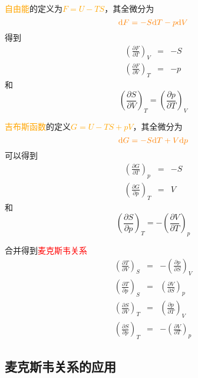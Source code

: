 \documentclass[11pt,a4paper]{article}
\newcommand{\dif}{\mathrm{d}}
\begin{document}
\textcolor{orange}{自由能}的定义为\textcolor{orange}{$F = U -TS$}，其全微分为
\begin{equation}
\color{orange} \dif F = -S \dif T - p\dif V
\end{equation}
得到
\begin{eqnarray}
\left( \frac{\partial F}{\partial T}\right)_V &=& -S \\
\left( \frac{\partial F}{\partial V}\right)_T &=& -p
\end{eqnarray}
和
\begin{equation}
\left( \frac{\partial S}{\partial V}\right)_T = \left( \frac{\partial p}{\partial T}\right)_V
\end{equation}

\textcolor{orange}{吉布斯函数}的定义\textcolor{orange}{$G = U -TS+pV$}，其全微分为
\begin{equation}
\color{orange} \dif G = -S \dif T +V\dif p
\end{equation}
可以得到
\begin{eqnarray}
\left( \frac{\partial G}{\partial T}\right)_p &=& -S \\
\left( \frac{\partial G}{\partial p}\right)_T &=& V
\end{eqnarray}
和
\begin{equation}
\left( \frac{\partial S}{\partial p}\right)_T = -\left( \frac{\partial V}{\partial T}\right)_p
\end{equation}

合并得到\textcolor{red}{麦克斯韦关系}
\begin{eqnarray}
\left( \frac{\partial T}{\partial V}\right)_S &=& -\left( \frac{\partial p}{\partial S}\right)_V \\
\left( \frac{\partial T}{\partial p}\right)_S &=& \left( \frac{\partial V}{\partial S}\right)_p \\
\left( \frac{\partial S}{\partial V}\right)_T &=& \left( \frac{\partial p}{\partial T}\right)_V \\
\left( \frac{\partial S}{\partial p}\right)_T &=& -\left( \frac{\partial V}{\partial T}\right)_p
\end{eqnarray}

\subsection{麦克斯韦关系的应用}
\end{document}
